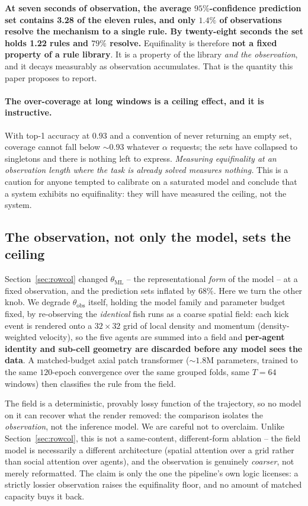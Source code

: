 \documentclass[11pt]{article}
\begin{document}
\textbf{At seven seconds of observation, the average $95\%$-confidence prediction set
contains 3.28 of the eleven rules, and only $1.4\%$ of observations resolve the
mechanism to a single rule. By twenty-eight seconds the set holds 1.22 rules and
$79\%$ resolve.} Equifinality is therefore \textbf{not a fixed property of a rule
library}. It is a property of the library \emph{and the observation}, and it decays
measurably as observation accumulates. That is the quantity this paper proposes to
report.

\paragraph{The over-coverage at long windows is a ceiling effect, and it is
instructive.} With top-1 accuracy at $0.93$ and a convention of never returning an
empty set, coverage cannot fall below ${\sim}0.93$ whatever $\alpha$ requests; the
sets have collapsed to singletons and there is nothing left to express.
\emph{Measuring equifinality at an observation length where the task is already solved
measures nothing.} This is a caution for anyone tempted to calibrate on a saturated
model and conclude that a system exhibits no equifinality: they will have measured the
ceiling, not the system.

\subsection{The observation, not only the model, sets the ceiling}
\label{sec:field}

Section~\ref{sec:rowcol} changed $\theta_{\mathrm{ML}}$ -- the representational
\emph{form} of the model -- at a fixed observation, and the prediction sets inflated by
$68\%$. Here we turn the other knob. We degrade $\theta_{\mathrm{obs}}$ itself, holding
the model family and parameter budget fixed, by re-observing the \emph{identical} fish
runs as a coarse spatial field: each kick event is rendered onto a $32\times32$ grid of
local density and momentum (density-weighted velocity), so the five agents are summed
into a field and \textbf{per-agent identity and sub-cell geometry are discarded before
any model sees the data}. A matched-budget axial patch transformer (${\sim}1.8$M
parameters, trained to the same $120$-epoch convergence over the same grouped folds,
same $T=64$ windows) then classifies the rule from the field.

The field is a deterministic, provably lossy function of the trajectory, so no model on
it can recover what the render removed: the comparison isolates the \emph{observation},
not the inference model. We are careful not to overclaim. Unlike
Section~\ref{sec:rowcol}, this is not a same-content, different-form ablation -- the
field model is necessarily a different architecture (spatial attention over a grid
rather than social attention over agents), and the observation is genuinely
\emph{coarser}, not merely reformatted. The claim is only the one the pipeline's own
logic licenses: a strictly lossier observation raises the equifinality floor, and no
amount of matched capacity buys it back.
\end{document}
